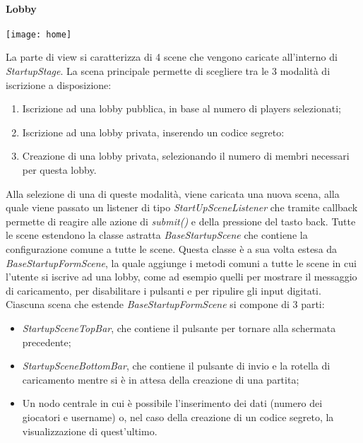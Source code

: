 \paragraph{Lobby}
\begin{center}
    \texttt{[image: home]}
\end{center}
La parte di view si caratterizza di 4 scene che vengono caricate all’interno di \textit{StartupStage}. La scena principale permette di scegliere tra le 3 modalità di iscrizione a disposizione:
\begin{enumerate}
    \item Iscrizione ad una lobby pubblica, in base al numero di players selezionati;
    \item Iscrizione ad una lobby privata, inserendo un codice segreto:
    \item Creazione di una lobby privata, selezionando il numero di membri necessari per questa lobby.
\end{enumerate}
Alla selezione di una di queste modalità, viene caricata una nuova scena, alla quale viene passato un listener di tipo \textit{StartUpSceneListener} che tramite callback permette di reagire alle azione di \textit{submit()} e della pressione del tasto back.
\newline \newline
Tutte le scene estendono la classe astratta \textit{BaseStartupScene} che contiene la configurazione comune a tutte le scene. Questa classe è a sua volta estesa da \textit{BaseStartupFormScene}, la quale aggiunge i metodi comuni a tutte le scene in cui l’utente si iscrive ad una lobby, come ad esempio quelli per mostrare il messaggio di caricamento, per disabilitare i pulsanti e per ripulire gli input digitati.
\newline \newline
Ciascuna scena che estende \textit{BaseStartupFormScene} si compone di 3 parti:
\begin{itemize}
    \item \textit{StartupSceneTopBar}, che contiene il pulsante per tornare alla schermata precedente;
    \item \textit{StartupSceneBottomBar}, che contiene il pulsante di invio e la rotella di caricamento mentre si è in attesa della creazione di una partita;
    \item Un nodo centrale in cui è possibile l’inserimento dei dati (numero dei giocatori e username) o, nel caso della creazione di un codice segreto, la visualizzazione di quest’ultimo.
\end{itemize}

